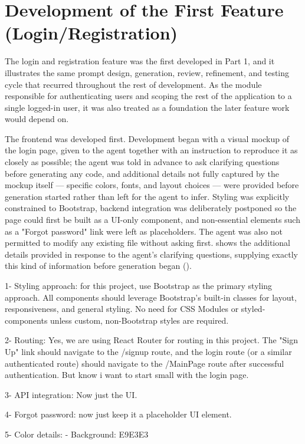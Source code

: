 \section{Development of the First Feature (Login/Registration)}

The login and registration feature was the first developed in Part 1, and it illustrates the same prompt design, generation, review, refinement, and testing cycle that recurred throughout the rest of development. As the module responsible for authenticating users and scoping the rest of the application to a single logged-in user, it was also treated as a foundation the later feature work would depend on.

The frontend was developed first. Development began with a visual mockup of the login page, given to the agent together with an instruction to reproduce it as closely as possible; the agent was told in advance to ask clarifying questions before generating any code, and additional details not fully captured by the mockup itself --- specific colors, fonts, and layout choices --- were provided before generation started rather than left for the agent to infer. Styling was explicitly constrained to Bootstrap, backend integration was deliberately postponed so the page could first be built as a UI-only component, and non-essential elements such as a "Forgot password" link were left as placeholders. The agent was also not permitted to modify any existing file without asking first.  shows the additional details provided in response to the agent's clarifying questions, supplying exactly this kind of information before generation began ().

\begin{listing}[H]
\begin{center}
\begin{promptbox}
1- Styling approach: for this project, use Bootstrap as the primary styling approach. All components should leverage Bootstrap's built-in classes for layout, responsiveness, and general styling. No need for CSS Modules or styled-components unless custom, non-Bootstrap styles are required.

2- Routing: Yes, we are using React Router for routing in this project. The "Sign Up" link should navigate to the /signup route, and the login route (or a similar authenticated route) should navigate to the /MainPage route after successful authentication. But know i want to start small with the login page.

3- API integration: Now just the UI.

4- Forgot password: now just keep it a placeholder UI element.

5- Color details:
- Background: E9E3E3
\end{promptbox}
\end{center}
\caption{Follow-up details provided in response to the agent's clarifying questions on the login page mockup.}
\label{lst:login-mockup-followup}
\end{listing}

